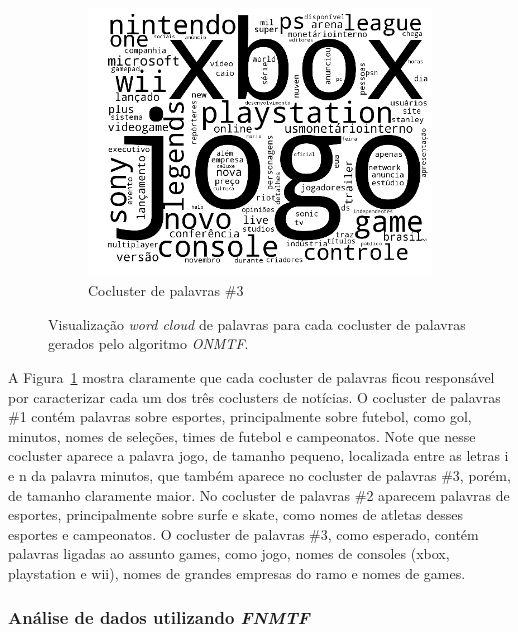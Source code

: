 \documentclass[
    12pt,                %
    oneside,            %
    a4paper,            %
    english,            %
    brazil                %
    ]{abntex2ppgsi}
\begin{document}
\begin{figure}[H]
\begin{subfigure}[b]{0.31\textwidth}
        \includegraphics[width=\textwidth]{img/onmtf-tc-3.png}
        \caption{Cocluster de palavras \#3}
    \end{subfigure}

    \caption{Visualização \textit{word cloud} de palavras para cada cocluster de palavras gerados pelo algoritmo \textit{ONMTF}.}
    \label{fig:onmtf:wordcloud}
\end{figure}

A Figura~\ref{fig:onmtf:wordcloud} mostra claramente que cada cocluster de palavras ficou responsável por caracterizar cada um dos três coclusters de notícias.
O cocluster de palavras \#1 contém palavras sobre esportes, principalmente sobre futebol, como gol, minutos, nomes de seleções, times de futebol e campeonatos.
Note que nesse cocluster aparece a palavra jogo, de tamanho pequeno, localizada entre as letras i e n da palavra minutos, que também aparece no cocluster de palavras \#3, porém, de tamanho claramente maior.
No cocluster de palavras \#2 aparecem palavras de esportes, principalmente sobre surfe e skate, como nomes de atletas desses esportes e campeonatos.
O cocluster de palavras \#3, como esperado, contém palavras ligadas ao assunto games, como jogo, nomes de consoles (xbox, playstation e wii), nomes de grandes empresas do ramo e nomes de games.


\subsubsection{Análise de dados utilizando \textit{FNMTF}}
\end{document}
